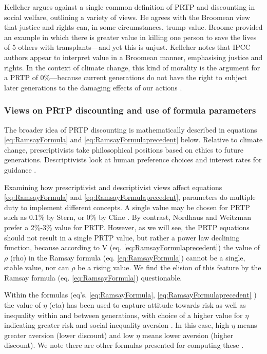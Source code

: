 \documentclass{article}
\begin{document}
Kelleher argues against a single common definition of PRTP and discounting in social welfare, outlining a variety of views. He agrees with the Broomean view that justice and rights can, in some circumstances, trump value. Broome provided an example in which there is greater value in killing one person to save the lives of 5 others with transplants---and yet this is unjust. Kelleher notes that IPCC authors appear to interpret value in a Broomean manner, emphasising justice and rights. In the context of climate change, this kind of morality is the argument for a PRTP of 0\%---because current generations do not have the right to subject later generations to the damaging effects of our actions \cite[p. 448-451]{Kelleher_2017PRTP(RPTP)}. 

\subsubsection{Views on PRTP discounting and use of formula parameters}
The broader idea of PRTP discounting is mathematically described in equations \ref{eq:RamsayFormula} and \ref{eq:RamsayFormulaprecedent} below. Relative to climate change, prescriptivists take philosophical positions based on ethics to future generations. Descriptivists look at human preference choices and interest rates for guidance \cite[p. 442]{Kelleher_2017PRTP(RPTP)}. 

Examining how prescriptivist and descriptivist views affect equations \ref{eq:RamsayFormula} and \ref{eq:RamsayFormulaprecedent}, parameters do multiple duty to implement different concepts. A single value may be chosen for PRTP such as 0.1\% by Stern, or 0\% by Cline \cite[p. 10]{Dietz2008EconEthicsClimate}. By contrast, Nordhaus and Weitzman prefer a 2\%-3\% value for PRTP. However, as we will see, the PRTP equations should not result in a single PRTP value, but rather a power law declining function, because according to V (eq. \ref{eq:RamsayFormulaprecedent}) the value of $\rho$ (rho) in the Ramsay formula (eq. \ref{eq:RamsayFormula}) cannot be a single, stable value, nor can $\rho$ be a rising value. We find the elision of this feature by the Ramsay formula (eq. \ref{eq:RamsayFormula}) questionable. 

Within the formulas (eq's. \ref{eq:RamsayFormula}, \ref{eq:RamsayFormulaprecedent} ) the value of $\eta$ (eta) has been used to capture attitude towards risk as well as inequality within and between generations, with choice of a higher value for $\eta$ indicating greater risk and social inequality aversion \cite[p. 11]{Dietz2008EconEthicsClimate}. In this case, high $\eta$ means greater aversion (lower discount) and low $\eta$ means lower aversion (higher discount). We note there are other formulas presented for computing these \cite[p. 11]{Dietz2008EconEthicsClimate}.  
\end{document}
